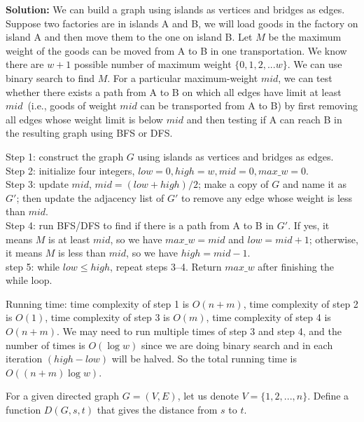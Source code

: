 \documentclass[11pt]{article}
\begin{document}
\begin{qunlist}
\textbf{Solution: }
We can build a graph using islands as vertices and bridges as edges.
Suppose two factories are in islands A and B, we will load goods in the factory on island A and then move them to the one on island B. 
Let $M$ be the maximum weight of the goods can be moved from A to B in one transportation.
We know there are $w+1$ possible number of maximum weight $\{0,1,2,...w\}$. %
We can use binary search to find $M$. For a particular maximum-weight $mid$, we can test whether there exists a path from A to B on which all edges have limit at least $mid$~(i.e., goods of weight $mid$ can be transported from A to B) by first removing all edges whose weight limit is below $mid$ and then testing if A can reach B in the resulting graph using BFS or DFS.

Step 1: construct the graph $G$ using islands as vertices and bridges as edges.\\
Step 2: initialize four integers, $low = 0, high = w, mid = 0, max\_w = 0$.\\
Step 3: update $mid$, $mid = (low+high)/2$; make a copy of $G$ and name it as $G'$; then update the adjacency list of $G'$ to remove any edge whose weight is less than $mid$.\\
Step 4: run BFS/DFS to find if there is a path from A to B in $G'$. If yes, it means $M$ is at least $mid$, so we have $max\_w = mid$ and $low = mid+1$; otherwise, it means $M$ is less than $mid$, so we have $high = mid-1$.\\
step 5: while $low \leq high$, repeat steps 3--4. Return $max\_w$ after finishing the while loop.

Running time: time complexity of step 1 is $O(n+m)$, time complexity of step 2 is $O(1)$, time complexity of step 3 is $O(m)$, time complexity of step 4 is $O(n+m)$. We may need to run multiple times of step 3 and step 4, and the number of times is $O(\log w)$ since we are doing binary search and in each iteration $(high-low)$ will be halved. So the total running time is $O((n + m) \log w)$.


For a given directed graph $G = (V, E)$, let us denote $V = \{1, 2, ..., n\}$.
Define a function $D(G, s, t)$ that gives the distance from $s$ to $t$.


\end{qunlist}
\end{document}
